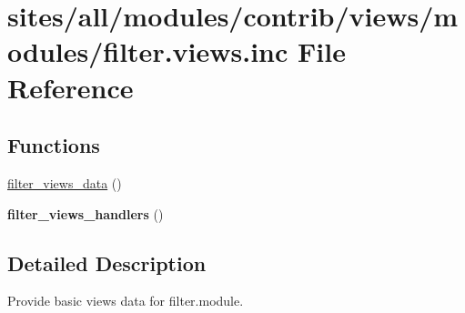 \hypertarget{filter_8views_8inc}{
\section{sites/all/modules/contrib/views/modules/filter.views.inc File Reference}
\label{filter_8views_8inc}
}
\subsection*{Functions}
\begin{CompactItemize}
\item 
\hyperlink{group__views__filter__module_g7cff84d71c43da31b5941bcc92d7bdac}{filter\_\-views\_\-data} ()
\item 
\hypertarget{group__views__filter__module_g5f7b3f041c39ab43ff7bf8044fbd2455}{
\textbf{filter\_\-views\_\-handlers} ()}
\label{group__views__filter__module_g5f7b3f041c39ab43ff7bf8044fbd2455}

\end{CompactItemize}


\subsection{Detailed Description}
Provide basic views data for filter.module. 